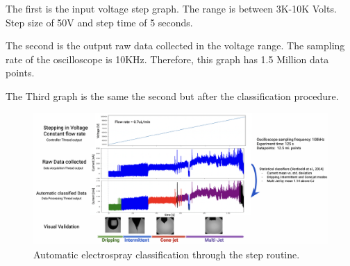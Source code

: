 The first is the input voltage step graph. The range is between 3K-10K Volts. Step size of 50V and step time of 5 seconds.

The second is the output raw data collected in the voltage range. The sampling rate of the oscilloscope is 10KHz. Therefore, this graph has 1.5 Million data points.

The Third graph is the same the second but after the classification procedure.





\begin{figure}[H]
    \center
    \includegraphics[width=18cm]{Figuras/may/step_class.png}
    \caption{Automatic electrospray classification through the step routine.}
    \label{fig:step_class}
\end{figure}

